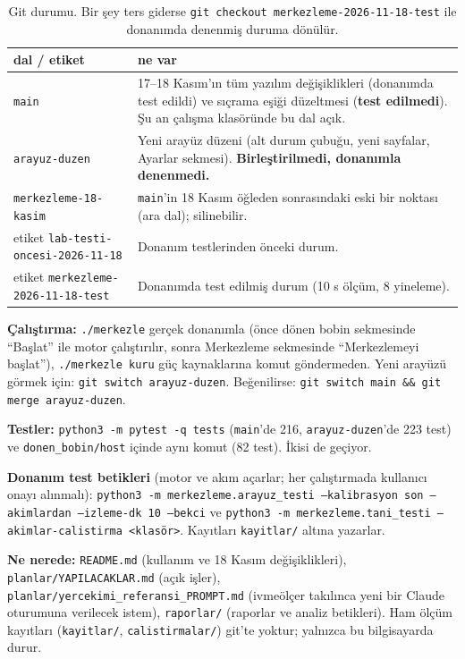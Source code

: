 \documentclass[11pt,a4paper]{article}
\newcommand{\kod}[1]{\texttt{#1}}
\begin{document}
\begin{table}[h]
\centering\small
\begin{tabular}{lp{9cm}}
\toprule
dal / etiket & ne var \\
\midrule
\kod{main} & 17--18 Kasım'ın tüm yazılım değişiklikleri (donanımda test edildi) ve sıçrama eşiği düzeltmesi
(\textbf{test edilmedi}). Şu an çalışma klasöründe bu dal açık. \\
\kod{arayuz-duzen} & Yeni arayüz düzeni (alt durum çubuğu, yeni sayfalar, Ayarlar sekmesi). \textbf{Birleştirilmedi,
donanımla denenmedi.} \\
\kod{merkezleme-18-kasim} & \kod{main}'in 18 Kasım öğleden sonrasındaki eski bir noktası (ara dal); silinebilir. \\
etiket \kod{lab-testi-oncesi-2026-11-18} & Donanım testlerinden önceki durum. \\
etiket \kod{merkezleme-2026-11-18-test} & Donanımda test edilmiş durum (10 s ölçüm, 8 yineleme). \\
\bottomrule
\end{tabular}
\caption{Git durumu. Bir şey ters giderse \kod{git checkout merkezleme-2026-11-18-test} ile donanımda denenmiş
duruma dönülür.}
\end{table}

\textbf{Çalıştırma:} \kod{./merkezle} gerçek donanımla (önce dönen bobin sekmesinde ``Başlat'' ile motor
çalıştırılır, sonra Merkezleme sekmesinde ``Merkezlemeyi başlat''), \kod{./merkezle kuru} güç kaynaklarına komut
göndermeden. Yeni arayüzü görmek için: \kod{git switch arayuz-duzen}. Beğenilirse: \kod{git switch main \&\&
git merge arayuz-duzen}.

\textbf{Testler:} \kod{python3 -m pytest -q tests} (\kod{main}'de 216, \kod{arayuz-duzen}'de 223 test) ve
\kod{donen\_bobin/host} içinde aynı komut (82 test). İkisi de geçiyor.

\textbf{Donanım test betikleri} (motor ve akım açarlar; her çalıştırmada kullanıcı onayı alınmalı):
\kod{python3 -m merkezleme.arayuz\_testi --kalibrasyon son --akimlardan --izleme-dk 10 --bekci} ve
\kod{python3 -m merkezleme.tani\_testi --akimlar-calistirma <klasör>}. Kayıtları \kod{kayitlar/} altına
yazarlar.

\textbf{Ne nerede:} \kod{README.md} (kullanım ve 18 Kasım değişiklikleri), \kod{planlar/YAPILACAKLAR.md} (açık işler),
\kod{planlar/yercekimi\_referansi\_PROMPT.md} (ivmeölçer takılınca yeni bir Claude oturumuna verilecek istem),
\kod{raporlar/} (raporlar ve analiz betikleri). Ham ölçüm kayıtları (\kod{kayitlar/}, \kod{calistirmalar/})
git'te yoktur; yalnızca bu bilgisayarda durur.
\end{document}

